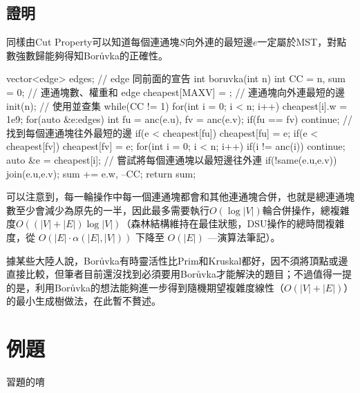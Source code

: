 \subsection{證明}
同樣由Cut Property可以知道每個連通塊$S$向外連的最短邊$e$一定屬於MST，對點數強數歸能夠得知Borůvka的正確性。
\begin{C++}
vector<edge> edges; // edge 同前面的宣告
int boruvka(int n){
    int CC = n, sum = 0; // 連通塊數、權重和
    edge cheapest[MAXV] = {}; // 連通塊向外連最短的邊
    init(n); // 使用並查集
    while(CC != 1){
        for(int i = 0; i < n; i++) cheapest[i].w = 1e9;
        for(auto &e:edges){
            int fu = anc(e.u), fv = anc(e.v);
            if(fu == fv) continue;
            // 找到每個連通塊往外最短的邊
            if(e < cheapest[fu]) cheapest[fu] = e;
            if(e < cheapest[fv]) cheapest[fv] = e;	
        }
        for(int i = 0; i < n; i++) {
            if(i != anc(i)) continue;
            auto &e = cheapest[i];
            // 嘗試將每個連通塊以最短邊往外連
            if(!same(e.u,e.v)) {
                join(e.u,e.v);
                sum += e.w, --CC;
            }
        }
    }
    return sum;
}
\end{C++}

可以注意到，每一輪操作中每一個連通塊都會和其他連通塊合併，也就是總連通塊數至少會減少為原先的一半，因此最多需要執行$O(\log|V|)$輪合併操作，總複雜度$O((|V|+|E|)\log|V|)$（森林結構維持在最佳狀態，DSU操作的總時間複雜度，從 $O(|E|\cdot\alpha(|E|,|V|))$ 下降至 $O(|E|)$ —演算法筆記）。

據某些大陸人說，Borůvka有時靈活性比Prim和Kruskal都好，因不須將頂點或邊直接比較，但筆者目前還沒找到必須要用Borůvka才能解決的題目；不過值得一提的是，利用Borůvka的想法能夠進一步得到隨機期望複雜度線性（$O(|V|+|E|)$）的最小生成樹做法，在此暫不贅述。

\section{例題}
習題的唷
